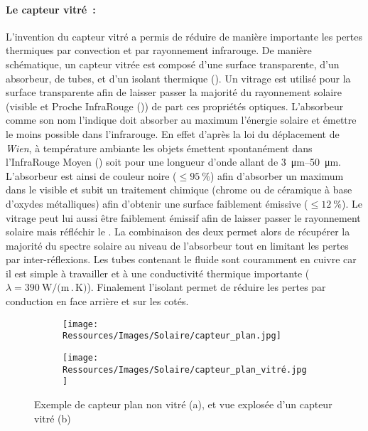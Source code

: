 \paragraph{Le capteur vitré~:} %
\label{par:le_capteur_vitre}
L’invention du capteur vitré a permis de réduire de manière importante les pertes
thermiques par convection et par rayonnement infrarouge. De manière schématique, un
capteur vitrée est composé d’une surface transparente, d’un absorbeur, de tubes, et d’un
isolant thermique (). Un vitrage est utilisé pour la
surface transparente afin de laisser passer la majorité du rayonnement solaire (visible et
Proche InfraRouge ()) de part ces propriétés optiques. L’absorbeur comme son nom
l’indique doit absorber au maximum l’énergie solaire et émettre le moins possible dans
l’infrarouge. En effet d’après la loi du déplacement de \textit{Wien}, à température
ambiante les objets émettent spontanément dans l’InfraRouge Moyen () soit pour
une longueur d’onde allant de \SIrange{3}{50}{\micro\metre}. L’absorbeur est ainsi de
couleur noire ($\leq \SI{95}{\percent}$) afin d’absorber un maximum dans le visible et
subit un traitement chimique (chrome ou de céramique à base d’oxydes métalliques) afin
d’obtenir une surface faiblement émissive ($\leq \SI{12}{\percent}$). Le vitrage peut lui
aussi être faiblement émissif afin de laisser passer le rayonnement solaire mais réfléchir
le . La combinaison des deux permet alors de récupérer la majorité du spectre
solaire au niveau de l’absorbeur tout en limitant les pertes par inter-réflexions. Les
tubes contenant le fluide sont couramment en cuivre car il est simple à travailler et à
une conductivité thermique importante ($\lambda = \SI{390}{\watt\per(\metre\period\kelvin)}$).
Finalement l’isolant permet de réduire les pertes par conduction en face arrière et sur les cotés.

\begin{figure}
    \centering
    \begin{subfigure}[b]{0.35\textwidth}
        \texttt{[image: Ressources/Images/Solaire/capteur\_plan.jpg]}
        \caption{}
        \label{fig:capteur_plan}
    \end{subfigure}
    \quad
    \begin{subfigure}[b]{0.55\textwidth}
        \texttt{[image: Ressources/Images/Solaire/capteur\_plan\_vitré.jpg]}
        \caption{}
        \label{fig:capteur_plan_vitre}
    \end{subfigure}
    \caption[Description des capteurs plans]
             {Exemple de capteur plan non vitré (a), et vue explosée d’un capteur vitré (b)}
    \label{fig:capteurs_plan}
\end{figure}


